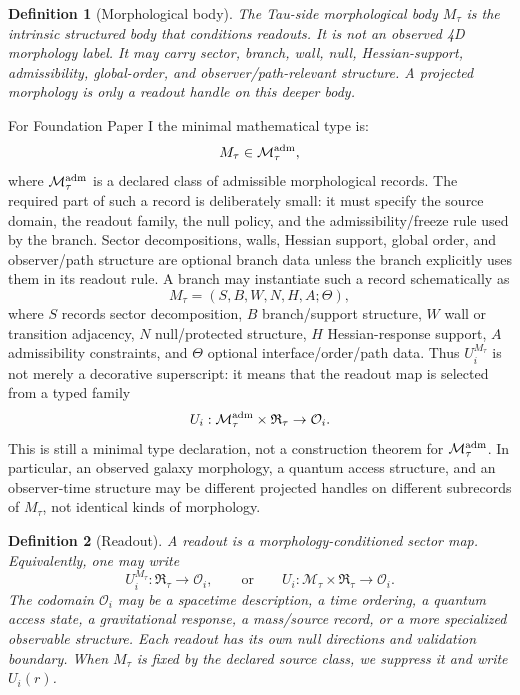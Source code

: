 \documentclass[11pt]{article}
\newtheorem{definition}{Definition}
\newcommand{\RTspace}{\mathfrak R_{\tau}}
\newcommand{\Mta}{M_{\tau}}
\newcommand{\Obs}{\mathcal O}
\begin{document}
\begin{definition}[Morphological body]
The Tau-side morphological body \(\Mta\) is the intrinsic structured body that
conditions readouts.  It is not an observed 4D morphology label.  It may carry
sector, branch, wall, null, Hessian-support, admissibility, global-order, and
observer/path-relevant structure.  A projected morphology is only a readout
handle on this deeper body.
\end{definition}

For Foundation Paper I the minimal mathematical type is:
\[
  \Mta\in\mathcal M_\tau^{\rm adm},
\]
where \(\mathcal M_\tau^{\rm adm}\) is a declared class of admissible
morphological records.  The required part of such a record is deliberately
small: it must specify the source domain, the readout family, the null policy,
and the admissibility/freeze rule used by the branch.  Sector decompositions,
walls, Hessian support, global order, and observer/path structure are optional
branch data unless the branch explicitly uses them in its readout rule.  A
branch may instantiate such a record schematically as
\[
  \Mta=(S,B,W,N,H,A;\Theta),
\]
where \(S\) records sector decomposition, \(B\) branch/support structure,
\(W\) wall or transition adjacency, \(N\) null/protected structure, \(H\)
Hessian-response support, \(A\) admissibility constraints, and \(\Theta\)
optional interface/order/path data.  Thus \(U_i^{\Mta}\) is not merely a
decorative superscript: it means that the readout map is selected from a typed
family
\[
  U_i:\mathcal M_\tau^{\rm adm}\times\RTspace\to\Obs_i.
\]
This is still a minimal type declaration, not a construction theorem for
\(\mathcal M_\tau^{\rm adm}\).  In particular, an observed galaxy morphology,
a quantum access structure, and an observer-time structure may be different
projected handles on different subrecords of \(\Mta\), not identical kinds of
morphology.

\begin{definition}[Readout]
A readout is a morphology-conditioned sector map.  Equivalently, one may write
\[
  U_i^{\Mta}:\RTspace\to\Obs_i,
  \qquad
  \text{or}
  \qquad
  U_i:\mathcal M_{\tau}\times \RTspace\to\Obs_i.
\]
The codomain \(\Obs_i\) may be a spacetime description, a time ordering, a
quantum access state, a gravitational response, a mass/source record, or a
more specialized observable structure.  Each readout has its own null
directions and validation boundary.  When \(\Mta\) is fixed by the declared
source class, we suppress it and write \(U_i(r)\).
\end{definition}
\end{document}
